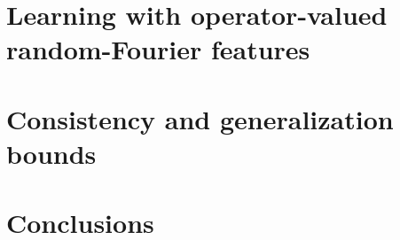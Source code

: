 \section{Learning with operator-valued random-Fourier features}
\label{sec:learning_with_operator-valued_random-fourier_features}

\section{Consistency and generalization bounds}
\label{sec:consistency and generalization bounds}

\section{Conclusions}
\label{sec:conclusions}

